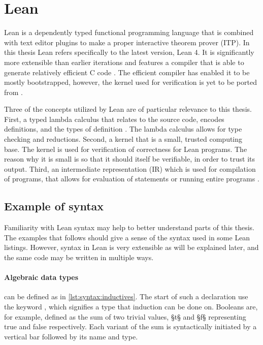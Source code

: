 \section{Lean}\label{sec:lean}
Lean is a dependently typed functional programming language that is combined with text editor plugins to make a proper interactive theorem prover (ITP).
In this thesis Lean refers specifically to the latest version, Lean 4.
It is significantly more extensible than earlier iterations and features a compiler that is able to generate relatively efficient C code \autocite{Lean4}.
The efficient compiler has enabled it to be mostly bootstrapped, however, the kernel used for verification is yet to be ported from \cpp.

Three of the concepts utilized by Lean are of particular relevance to this thesis.
First, a typed lambda calculus that relates to the source code, encodes definitions, and the types of definition \autocite{Declaration}.
The lambda calculus allows for type checking and reductions.
Second, a kernel that is a small, trusted computing base.
The kernel is used for verification of correctness for Lean programs.
The reason why it is small is so that it should itself be verifiable, in order to trust its output.
Third, an intermediate representation (IR) which is used for compilation of programs, that allows for evaluation of statements or running entire programs \autocite{IR}.

\subsection{Example of syntax}
Familiarity with Lean syntax may help to better understand parts of this thesis.
The examples that follows should give a sense of the syntax used in some Lean listings.
However, syntax in Lean is very extensible as will be explained later, and the same code may be written in multiple ways.

\paragraph*{Algebraic data types} can be defined as in \cref{lst:syntax:inductives}.
The start of such a declaration use the keyword , which signifies a type that induction can be done on.
Booleans are, for example, defined as the sum of two trivial values, §t§ and §f§ representing true and false respectively.
Each variant of the sum is syntactically initiated by a vertical bar followed by its name and type.

